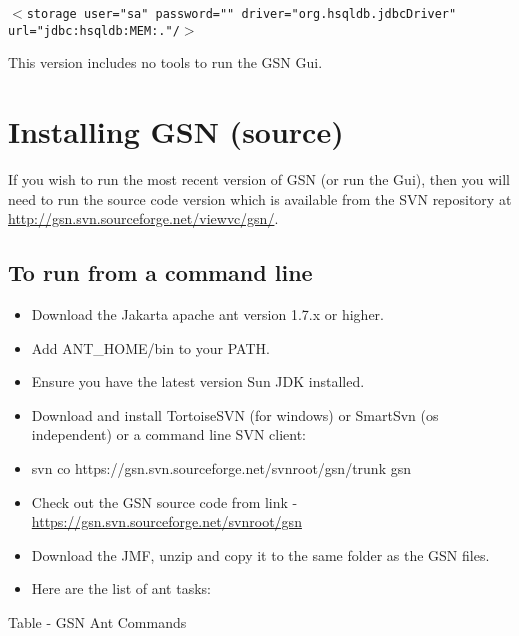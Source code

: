 \texttt{\begin{math}<\end{math}storage user="sa" password=""
driver="org.hsqldb.jdbcDriver"
url="jdbc:hsqldb:MEM:."/\begin{math}>\end{math}}



This version includes no tools to run the GSN Gui.

\section{Installing GSN (source)}

If you wish to run the most recent version of GSN (or run the Gui),
then you will need to run the source code version which is available
from the SVN repository at
\url{http://gsn.svn.sourceforge.net/viewvc/gsn/}.

\subsection{To run from a command line}

\begin{itemize}
	\item Download the Jakarta apache ant version 1.7.x or higher.
	\item Add ANT\_HOME/bin to your PATH.
	\item Ensure you have the latest version Sun JDK installed.
	\item Download and install TortoiseSVN (for windows) or SmartSvn (os
independent) or a command line SVN client:
	\item svn co https://gsn.svn.sourceforge.net/svnroot/gsn/trunk gsn
	\item Check out the GSN source code from link -
\url{https://gsn.svn.sourceforge.net/svnroot/gsn}
	\item Download the JMF, unzip and copy it to the same folder as the GSN
files.
	\item Here are the list of ant tasks:
\end{itemize}



Table  - GSN Ant Commands

